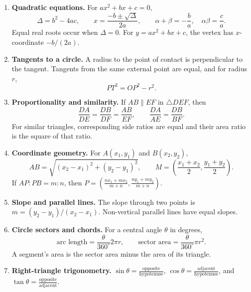 \begin{enumerate}[label=\normalfont 1.1.\arabic*.,ref=1.1.\arabic*]
\setlength{\itemsep}{0.35em}
\item \label{formula-1-1-1} \textbf{Quadratic equations.} For $ax^2+bx+c=0$,
\begin{equation*}\tag{1.1.1.1}
\Delta=b^2-4ac,\qquad x=\frac{-b\pm\sqrt{\Delta}}{2a},\qquad
\alpha+\beta=-\frac ba,\quad \alpha\beta=\frac ca.
\end{equation*}
Equal real roots occur when $\Delta=0$. For $y=ax^2+bx+c$, the vertex has $x$-coordinate $-b/(2a)$.
\item \label{formula-1-1-2} \textbf{Tangents to a circle.} A radius to the point of contact is perpendicular to the tangent. Tangents from the same external point are equal, and for radius $r$,
\begin{equation*}\tag{1.1.2.1}
PT^2=OP^2-r^2.
\end{equation*}
\item \label{formula-1-1-3} \textbf{Proportionality and similarity.} If $AB\parallel EF$ in $\triangle DEF$, then
\begin{equation*}\tag{1.1.3.1}
\frac{DA}{DE}=\frac{DB}{DF}=\frac{AB}{EF},\qquad
\frac{DA}{AE}=\frac{DB}{BF}.
\end{equation*}
For similar triangles, corresponding side ratios are equal and their area ratio is the square of that ratio.
\item \label{formula-1-1-4} \textbf{Coordinate geometry.} For $A(x_1,y_1)$ and $B(x_2,y_2)$,
\begin{equation*}\tag{1.1.4.1}
AB=\sqrt{(x_2-x_1)^2+(y_2-y_1)^2},\qquad
M=\left(\frac{x_1+x_2}{2},\frac{y_1+y_2}{2}\right).
\end{equation*}
If $AP:PB=m:n$, then $P=\left(\frac{nx_1+mx_2}{m+n},\frac{ny_1+my_2}{m+n}\right)$.
\item \label{formula-1-1-5} \textbf{Slope and parallel lines.} The slope through two points is $m=(y_2-y_1)/(x_2-x_1)$. Non-vertical parallel lines have equal slopes.
\item \label{formula-1-1-6} \textbf{Circle sectors and chords.} For a central angle $\theta$ in degrees,
\begin{equation*}\tag{1.1.6.1}
\text{arc length}=\frac{\theta}{360^\circ}2\pi r,\qquad
\text{sector area}=\frac{\theta}{360^\circ}\pi r^2.
\end{equation*}
A segment's area is the sector area minus the area of its triangle.
\item \label{formula-1-1-7} \textbf{Right-triangle trigonometry.} $\sin\theta=\frac{\text{opposite}}{\text{hypotenuse}}$, $\cos\theta=\frac{\text{adjacent}}{\text{hypotenuse}}$, and $\tan\theta=\frac{\text{opposite}}{\text{adjacent}}$.

\end{enumerate}
